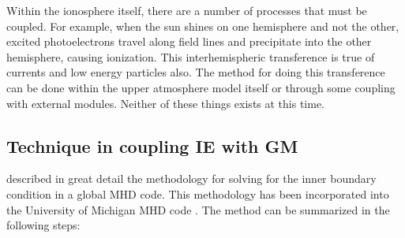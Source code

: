 \documentclass[twoside,10pt]{article}
\begin{document}
Within the ionosphere itself, there are a number of processes that
must be coupled.  For example, when the sun shines on one hemisphere
and not the other, excited photoelectrons travel along field lines and
precipitate into the other hemisphere, causing ionization.  This
interhemispheric transference is true of currents and low energy
particles also.  The method for doing this transference can be done
within the upper atmosphere model itself or through some coupling with
external modules.  Neither of these things exists at this time.

\subsection{Technique in coupling IE with GM}

\cite{goodman95} described in great detail the methodology for solving
for the inner boundary condition in a global MHD code.  This
methodology has been incorporated into the University of Michigan MHD
code \cite{powell99, ridley_aec, ridley_metrics}.  The method can be
summarized in the following steps:
\end{document}
